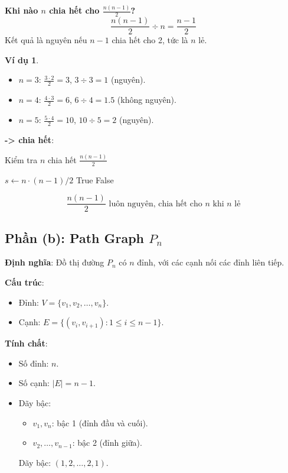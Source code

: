 \documentclass[a4paper,12pt]{article}
\theoremstyle{plain}
\theoremstyle{definition}
\newtheorem{example}{Ví dụ}
\begin{document}
\textbf{Khi nào \( n \) chia hết cho \( \frac{n(n-1)}{2} \)?}
\[
\frac{n(n-1)}{2} \div n = \frac{n-1}{2}
\]
Kết quả là nguyên nếu \( n-1 \) chia hết cho 2, tức là \( n \) lẻ.

\begin{example}
\begin{itemize}
    \item \( n=3 \): \( \frac{3 \cdot 2}{2} = 3 \), \( 3 \div 3 = 1 \) (nguyên).
    \item \( n=4 \): \( \frac{4 \cdot 3}{2} = 6 \), \( 6 \div 4 = 1.5 \) (không nguyên).
    \item \( n=5 \): \( \frac{5 \cdot 4}{2} = 10 \), \( 10 \div 5 = 2 \) (nguyên).
\end{itemize}
\end{example}

\textbf{ -> chia hết}:
\begin{algorithm}
\caption{Kiểm tra \( n \) chia hết \( \frac{n(n-1)}{2} \)}
\begin{algorithmic}
    \State $s \gets n \cdot (n-1) / 2$
     \Return True
    \Else \Return False
    \EndIf
\EndFunction
\end{algorithmic}
\end{algorithm}

\[
\boxed{\frac{n(n-1)}{2} \text{ luôn nguyên, chia hết cho } n \text{ khi } n \text{ lẻ}}
\]

\subsection*{Phần (b): Path Graph \( P_n \)}

\textbf{Định nghĩa}: Đồ thị đường \( P_n \) có \( n \) đỉnh, với các cạnh nối các đỉnh liên tiếp.

\textbf{Cấu trúc}:
\begin{itemize}
    \item Đỉnh: \( V = \{v_1, v_2, \ldots, v_n\} \).
    \item Cạnh: \( E = \{(v_i, v_{i+1}) : 1 \leq i \leq n-1\} \).
\end{itemize}

\textbf{Tính chất}:
\begin{itemize}
    \item Số đỉnh: \( n \).
    \item Số cạnh: \( |E| = n-1 \).
    \item Dãy bậc:
    \begin{itemize}
        \item \( v_1, v_n \): bậc 1 (đỉnh đầu và cuối).
        \item \( v_2, \ldots, v_{n-1} \): bậc 2 (đỉnh giữa).
    \end{itemize}
    Dãy bậc: \( (1, 2, \ldots, 2, 1) \).
\end{itemize}
\end{document}
